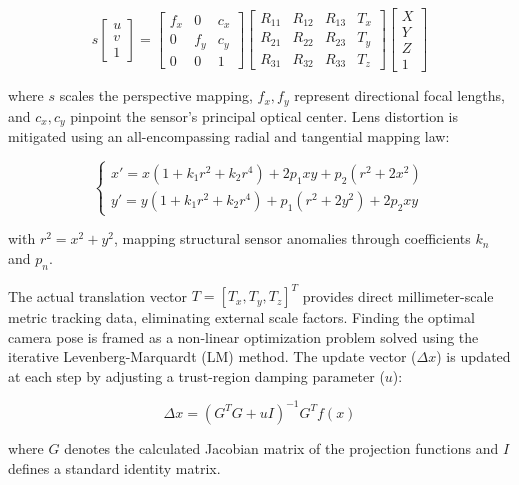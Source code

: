 \begin{equation}
s \begin{bmatrix} u \\ v \\ 1 \end{bmatrix} = \begin{bmatrix} f_x & 0 & c_x \\ 0 & f_y & c_y \\ 0 & 0 & 1 \end{bmatrix} \begin{bmatrix} R_{11} & R_{12} & R_{13} & T_x \\ R_{21} & R_{22} & R_{23} & T_y \\ R_{31} & R_{32} & R_{33} & T_z \end{bmatrix} \begin{bmatrix} X \\ Y \\ Z \\ 1 \end{bmatrix}
\end{equation}

where $s$ scales the perspective mapping, $f_x, f_y$ represent directional focal lengths, and $c_x, c_y$ pinpoint the sensor's principal optical center. Lens distortion is mitigated using an all-encompassing radial and tangential mapping law:

\begin{equation}
\begin{cases} 
x' = x(1 + k_1r^2 + k_2r^4) + 2p_1xy + p_2(r^2 + 2x^2) \\ 
y' = y(1 + k_1r^2 + k_2r^4) + p_1(r^2 + 2y^2) + 2p_2xy 
\end{cases}
\end{equation}

with $r^2 = x^2 + y^2$, mapping structural sensor anomalies through coefficients $k_n$ and $p_n$. 

The actual translation vector $T = [T_x, T_y, T_z]^T$ provides direct millimeter-scale metric tracking data, eliminating external scale factors. Finding the optimal camera pose is framed as a non-linear optimization problem solved using the iterative Levenberg-Marquardt (LM) method. The update vector ($\Delta x$) is updated at each step by adjusting a trust-region damping parameter ($u$):

\begin{equation}
\Delta x = (G^T G + uI)^{-1} G^T f(x)
\end{equation}

where $G$ denotes the calculated Jacobian matrix of the projection functions and $I$ defines a standard identity matrix.